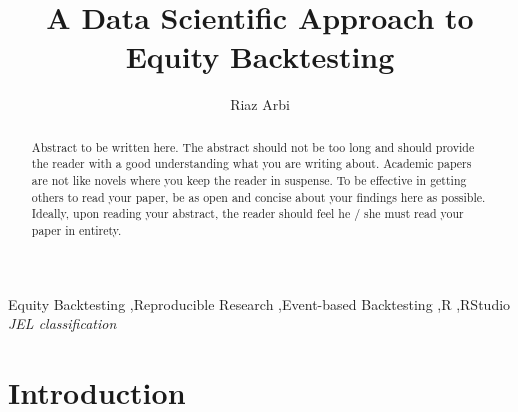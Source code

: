 \documentclass[11pt,preprint, authoryear]{elsarticle}
\numberwithin{equation}{section}
\numberwithin{figure}{section}
\numberwithin{table}{section}
\begin{document}
\begin{frontmatter}  %

\title{A Data Scientific Approach to Equity Backtesting}





\author[Add1]{Riaz Arbi}
\ead{}





\address[Add1]{University of Cape Town, South Africa}


\begin{abstract}
\small{
Abstract to be written here. The abstract should not be too long and
should provide the reader with a good understanding what you are writing
about. Academic papers are not like novels where you keep the reader in
suspense. To be effective in getting others to read your paper, be as
open and concise about your findings here as possible. Ideally, upon
reading your abstract, the reader should feel he / she must read your
paper in entirety.
}
\end{abstract}

\vspace{1cm}

\begin{keyword}
\footnotesize{
Equity Backtesting \sep Reproducible Research \sep Event-based
Backtesting \sep R \sep RStudio \\ \vspace{0.3cm}
\textit{JEL classification} 
}
\end{keyword}
\vspace{0.5cm}
\end{frontmatter}


\renewcommand{\contentsname}{Table of Contents}
{\tableofcontents}

\pagestyle{fancy}
\chead{}
\rhead{}
\lfoot{}
\lhead{}
\cfoot{}


\headsep 35pt %




\pagebreak 

\section{\texorpdfstring{Introduction
\label{Introduction}}{Introduction }}\label{introduction}
\end{document}
